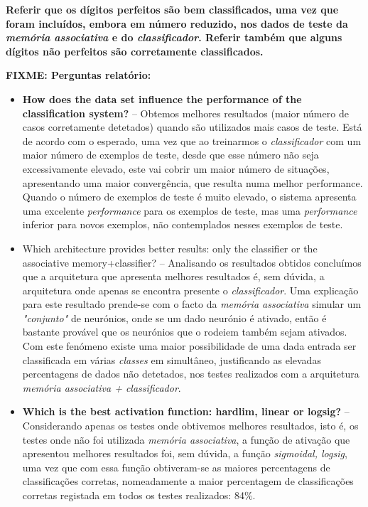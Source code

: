\documentclass{article}
\begin{document}
\textbf{Referir que os dígitos perfeitos são bem classificados, uma vez que foram incluídos, embora em número reduzido, nos dados de teste da \emph{memória associativa} e do \emph{classificador}. Referir também que alguns dígitos não perfeitos são corretamente classificados.}


\vspace{.3cm}

\textbf{FIXME: Perguntas relatório:}

\begin{itemize}
\item \textbf{How does the data set influence the performance of the classification system?} -- Obtemos melhores resultados (maior número de casos corretamente detetados) quando são utilizados mais casos de teste. Está de acordo com o esperado, uma vez que ao treinarmos o \emph{classificador} com um maior número de exemplos de teste, desde que esse número não seja excessivamente elevado, este vai cobrir um maior número de situações, apresentando uma maior convergência, que resulta numa melhor performance. Quando o número de exemplos de teste é muito elevado, o sistema apresenta uma excelente \emph{performance} para os exemplos de teste, mas uma \emph{performance} inferior para novos exemplos, não contemplados nesses exemplos de teste.

\item Which architecture provides better results: only the classifier or the associative memory+classifier? -- Analisando os resultados obtidos concluímos que a arquitetura que apresenta melhores resultados é, sem dúvida, a arquitetura onde apenas se encontra presente o \emph{classificador}. Uma explicação para este resultado prende-se com o facto da \emph{memória associativa} simular um \emph{"conjunto"} de neurónios, onde se um dado neurónio é ativado, então é bastante provável que os neurónios que o rodeiem também sejam ativados. Com este fenómeno existe uma maior possibilidade de uma dada entrada ser classificada em várias \emph{classes} em simultâneo, justificando as elevadas percentagens de dados não detetados, nos testes realizados com a arquitetura \emph{memória associativa + classificador}.

\item \textbf{Which is the best activation function: hardlim, linear or logsig?} -- Considerando apenas os testes onde obtivemos melhores resultados, isto é, os testes onde não foi utilizada \emph{memória associativa}, a função de ativação que apresentou melhores resultados foi, sem dúvida, a função \emph{sigmoidal, logsig}, uma vez que com essa função obtiveram-se as maiores percentagens de classificações corretas, nomeadamente a maior percentagem de classificações corretas registada em todos os testes realizados: 84\%.


\end{itemize}
\end{document}

